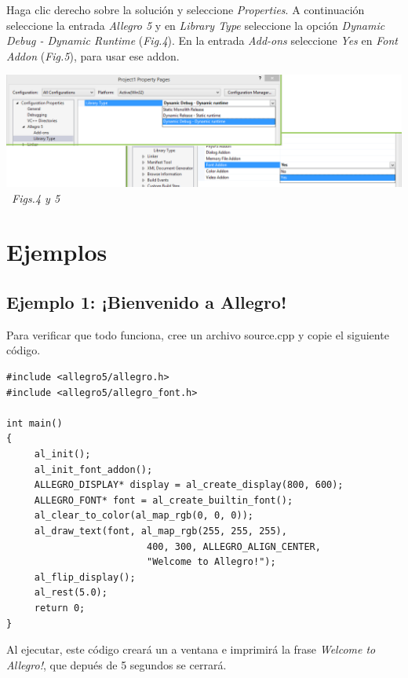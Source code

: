 \documentclass[11pt]{article}
\begin{document}
Haga clic derecho sobre la solución y seleccione \emph{Properties}. A continuación seleccione la entrada \emph{Allegro 5} y en \emph{Library Type} seleccione la opción \emph{Dynamic Debug - Dynamic Runtime} (\emph{Fig.4}).
En la entrada \emph{Add-ons} seleccione \emph{Yes} en \emph{Font Addon} (\emph{Fig.5}), para usar ese addon.\\
\begin{center}
\includegraphics[scale=0.4]{SC67.png}
\ \emph{Figs.4 y 5}
\end{center}

\section{Ejemplos}
\subsection{Ejemplo 1: ¡Bienvenido a Allegro!}
Para verificar que todo funciona, cree un archivo source.cpp y copie el siguiente código.
\begin{verbatim}
#include <allegro5/allegro.h>
#include <allegro5/allegro_font.h>
 
int main()
{
     al_init();
     al_init_font_addon();
     ALLEGRO_DISPLAY* display = al_create_display(800, 600);
     ALLEGRO_FONT* font = al_create_builtin_font();
     al_clear_to_color(al_map_rgb(0, 0, 0));
     al_draw_text(font, al_map_rgb(255, 255, 255),
                         400, 300, ALLEGRO_ALIGN_CENTER, 
                         "Welcome to Allegro!");
     al_flip_display();
     al_rest(5.0);
     return 0;
}
\end{verbatim}
Al ejecutar, este código creará un a ventana e imprimirá la frase \emph{Welcome to Allegro!}, que depués de 5 segundos se cerrará.
\end{document}
